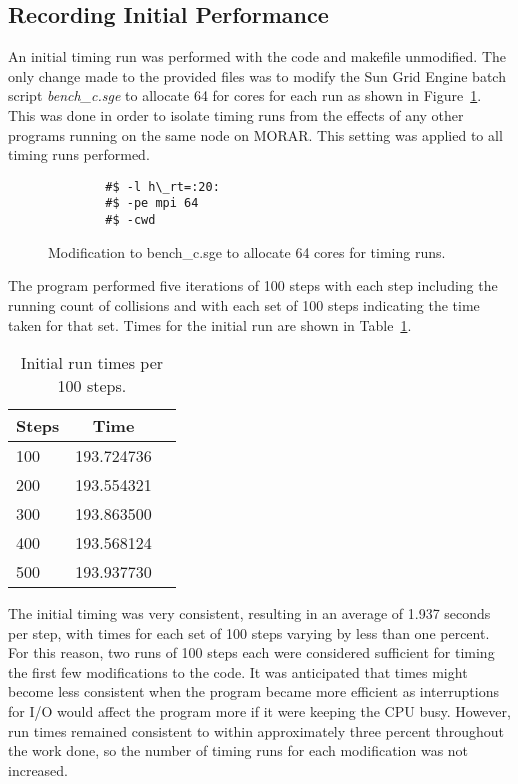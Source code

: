 \documentclass[11pt, oneside]{article}   %
\begin{document}
\subsection{Recording Initial Performance}
An initial timing run was performed with the code and makefile unmodified.
The only change made to the provided files was to modify the Sun Grid Engine batch script {\em bench\_c.sge} to allocate 64 for cores for each run as shown in Figure~\ref{fig:batchsge}.
This was done in order to isolate timing runs from the effects of any other programs running on the same node on MORAR.
This setting was applied to all timing runs performed.

\begin{figure}
	\begin{lstlisting}
		#$ -l h\_rt=:20:
		#$ -pe mpi 64
		#$ -cwd
	\end{lstlisting}
	\caption{Modification to bench\_c.sge to allocate 64 cores for timing runs.}
	\label{fig:batchsge}
\end{figure}

The program performed five iterations of 100 steps with each step including the running count of collisions and with each set of 100 steps indicating the time taken for that set.
Times for the initial run are shown in Table~\ref{table:InitialRunTimes}.

\begin{table}[h]
	\begin{center}
		\begin{tabular}{||l|c|l||}
			\hline
				{\bf Steps} & {\bf Time}\\
			\hline
				100  &  193.724736\\
				200  &  193.554321\\
				300  &  193.863500\\
				400  &  193.568124\\
				500  &  193.937730\\
			\hline
		\end{tabular}
	\end{center}
	\caption{Initial run times per 100 steps.}
	\label{table:InitialRunTimes}
\end{table}

The initial timing was very consistent, resulting in an average of 1.937 seconds per step, with times for each set of 100 steps varying by less than one percent.
For this reason, two runs of 100 steps each were considered sufficient for timing the first few modifications to the code.
It was anticipated that times might become less consistent when the program became more efficient as interruptions for I/O would affect the program more if it were keeping the CPU busy.
However, run times remained consistent to within approximately three percent throughout the work done, so the number of timing runs for each modification was not increased.
\end{document}
